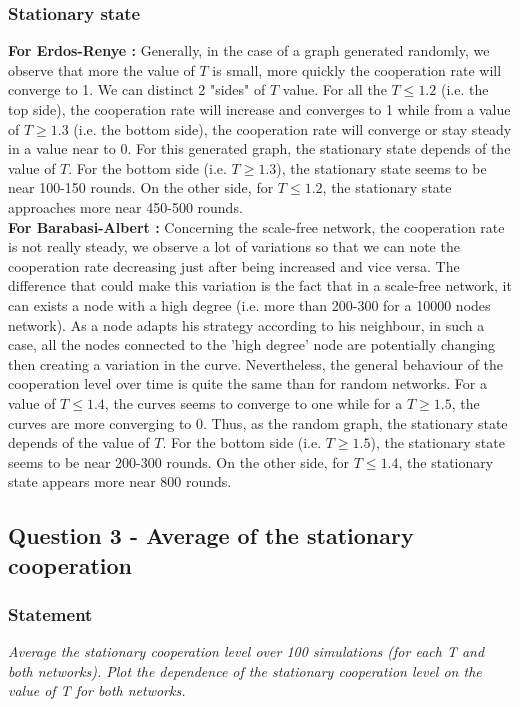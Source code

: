 \documentclass{article}
\begin{document}
\newpage
\subsubsection{Stationary state}
\textbf{For Erdos-Renye :} Generally, in the case of a graph generated randomly, we observe that more the value of $T$ is small, more quickly the cooperation rate will converge to 1.  We can distinct 2 "sides" of $T$ value. For all the $T \le 1.2$ (i.e. the top side), the cooperation rate will increase and converges to 1 while from a value of $T \ge 1.3$ (i.e. the bottom side), the cooperation rate will converge or stay steady in a value near to 0. For this generated graph, the stationary state depends of the value of $T$. For the bottom side (i.e. $T \ge 1.3$), the stationary state seems to be near 100-150 rounds. On the other side, for $T \le 1.2$, the stationary state approaches more near 450-500 rounds. \\

\noindent
\textbf{For Barabasi-Albert :} Concerning the scale-free network, the cooperation rate is not really steady, we observe a lot of variations so that we can note the cooperation rate decreasing just after being increased and vice versa. The difference that could make this variation is the fact that in a scale-free network, it can exists a node with a high degree (i.e. more than 200-300 for a 10000 nodes network). As a node adapts his strategy according to his neighbour, in such a case, all the nodes connected to the 'high degree' node are potentially changing then creating a variation in the curve. Nevertheless, the general behaviour of the cooperation level over time is quite the same than for random networks. For a value of $T \le 1.4$, the curves seems to converge to one while for a $T \ge 1.5$, the curves are more converging to 0. Thus, as the random graph, the stationary state depends of the value of $T$. For the bottom side (i.e. $T \ge 1.5$), the stationary state seems to be near 200-300 rounds. On the other side, for $T \le 1.4$, the stationary state appears more near 800 rounds.  

\subsection{Question 3 - Average of the stationary cooperation}

\subsubsection*{Statement}
\textit{Average the stationary cooperation level over 100 simulations (for each T and both networks). Plot the dependence of the stationary cooperation level on the value of T for both networks.}
\end{document}
